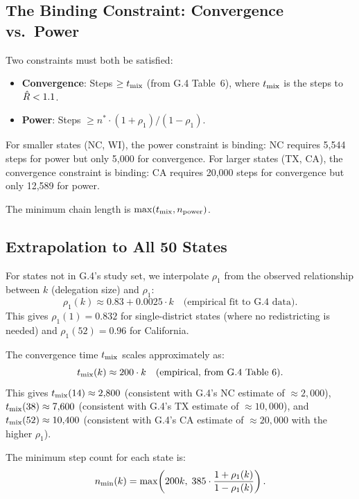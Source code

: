 \subsection{The Binding Constraint: Convergence vs.\ Power}

Two constraints must both be satisfied:
\begin{itemize}
\item \textbf{Convergence}: Steps $\geq t_{\rm mix}$ (from G.4 Table~6),
  where $t_{\rm mix}$ is the steps to $\hat{R} < 1.1$.
\item \textbf{Power}: Steps $\geq n^* \cdot (1+\rho_1)/(1-\rho_1)$.
\end{itemize}

For smaller states (NC, WI), the power constraint is binding:
NC requires 5,544 steps for power but only 5,000 for convergence.
For larger states (TX, CA), the convergence constraint is binding:
CA requires 20,000 steps for convergence but only 12,589 for power.

The minimum chain length is $\max(t_{\rm mix}, n_{\rm power})$.

\subsection{Extrapolation to All 50 States}

For states not in G.4's study set, we interpolate $\rho_1$ from the
observed relationship between $k$ (delegation size) and $\rho_1$:
\[
  \rho_1(k) \approx 0.83 + 0.0025 \cdot k \quad \text{(empirical fit to G.4 data)}.
\]
This gives $\rho_1(1) = 0.832$ for single-district states (where no
redistricting is needed) and $\rho_1(52) = 0.96$ for California.

The convergence time $t_{\rm mix}$ scales approximately as:
\[
  t_{\rm mix}(k) \approx 200 \cdot k \quad \text{(empirical, from G.4 Table 6)}.
\]
This gives $t_{\rm mix}(14) \approx 2{,}800$ (consistent with G.4's NC estimate
of $\approx 2{,}000$), $t_{\rm mix}(38) \approx 7{,}600$ (consistent with G.4's
TX estimate of $\approx 10{,}000$), and $t_{\rm mix}(52) \approx 10{,}400$
(consistent with G.4's CA estimate of $\approx 20{,}000$ with the higher
$\rho_1$).

The minimum step count for each state is:
\[
  n_{\rm min}(k) = \max\!\left(
    200k,\;
    385 \cdot \frac{1 + \rho_1(k)}{1 - \rho_1(k)}
  \right).
\]
